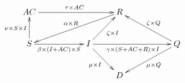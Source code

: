 \documentclass{article}
\begin{document}
\[
    \xymatrix{
        AC \ar[rrr]^{\tau \times AC} & & & R \ar[dlll]_{\alpha\times R} & \\
        S\ar[rr]_{\beta\times (I + AC) \times S}\ar[u]^{\nu \times S \times I} & & I \ar[ur]_{\zeta\times I}\ar[rrr]_{\gamma \times (S + AC + R) \times I} \ar[dr]_{\mu \times I} & & &
        Q\ar[ull]_{\zeta\times Q} \ar[dll]^{\mu \times Q}\\
        & &  & D &
    }
\]
\end{document}
